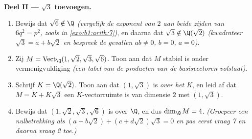 \begin{problem}
\medskip
\noindent\textbf{Deel II --- $\sqrt3$ toevoegen.}
\begin{enumerate}[resume]
  \item Bewijs dat $\sqrt6 \notin \Q$ \emph{(vergelijk de exponent
        van $2$ aan beide zijden van $6q^2 = p^2$, zoals in
        \cref{exo:b1:arith:7})}, en daarna dat $\sqrt3 \notin
        \Q(\sqrt2)$ \emph{(kwadrateer $\sqrt3 = a + b\sqrt2$ en
        bespreek de gevallen $ab \neq 0$, $b = 0$, $a = 0$)}.
  \item Zij $M = \operatorname{Vect}_\Q(1, \sqrt2, \sqrt3,
        \sqrt6)$. Toon aan dat $M$ stabiel is onder
        vermenigvuldiging \emph{(een tabel van de producten van de
        basisvectoren volstaat)}.
  \item Schrijf $K = \Q(\sqrt2)$. Toon aan dat $(1, \sqrt3)$ 
        is \emph{over het  $K$}, en leid af dat $M = K +
        K\sqrt3$ een $K$-vectorruimte is van dimensie $2$ met 
        $(1, \sqrt3)$.
  \item Bewijs dat $(1, \sqrt2, \sqrt3, \sqrt6)$  is over $\Q$,
        en dus $\dim_\Q M = 4$. \emph{(Groepeer een nulbetrekking
        als $(a + b\sqrt2) + (c + d\sqrt2)\sqrt3 = 0$ en pas eerst
        vraag 7 en daarna vraag 2 toe.)}
\end{enumerate}


\end{problem}
